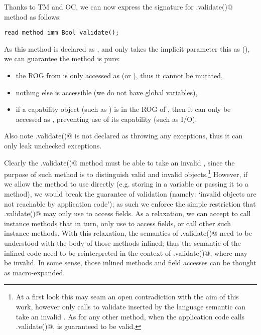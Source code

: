 Thanks to TM and OC, we can now express the signature for \Q@.validate()@ method as follows:
\saveSpace
\begin{lstlisting}
read method imm Bool validate();
\end{lstlisting}
\saveSpace

As this method is declared as \Q@read@, and only takes the implicit parameter this as (\Q@read@), we can guarantee the method is pure:
\begin{itemize}
\item the ROG from \Q@this@ is only accessed as \Q@read@ (or \Q@imm@), thus it cannot be mutated,
\item nothing else is accessible (we do not have global variables),
\item if a capability object (such as \Q@System@) is in the ROG of \Q@this@, then it can only be accessed as \Q@read@, preventing use of its capability (such as I/O).
\end{itemize}

\noindent Also note \Q@.validate()@ is not declared as throwing any exceptions, thus it can only leak unchecked exceptions.


Clearly the \Q@.validate()@ method must be able to take an invalid \Q@this@, since the purpose of such method is to distinguish valid and invalid objects.\footnote{
At a first look this may seam an open contradiction
with the aim of this work, however only calls to validate inserted by the language semantic can take an invalid \Q@this@. As for any other method, when the application code calls \Q@.validate()@,
\Q@this@ is guaranteed to be valid.
} However, if we allow the method to use \Q@this@ directly (e.g. storing in a variable or passing it to a method), we would break the guarantee of validation (namely: `invalid objects are not reachable by application code'); as such we enforce the simple restriction that \Q@.validate()@ may only use \Q@this@ to access fields.
As a relaxation, we can accept to call instance methods that in turn, only use \Q@this@ to access fields, or call other such instance methods. With this relaxation, the semantics of \Q@.validate()@ need to be understood with the body of those methods inlined; thus the semantic of the inlined code need to be reinterpreted in the context of \Q@.validate()@, where \Q@this@ may be invalid.
In some sense, those inlined methods and field accesses can be thought as macro-expanded.


